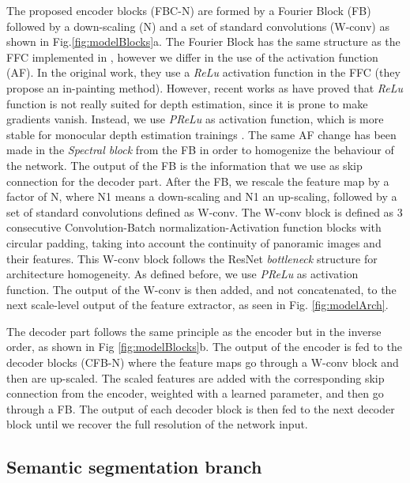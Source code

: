\documentclass[letterpaper, 10 pt, conference]{ieeeconf}
\begin{document}
The proposed encoder blocks (FBC-N) are formed by a Fourier Block (FB) followed by a down-scaling (N) and a set of standard convolutions (W-conv) as shown in Fig.\ref{fig:modelBlocks}a. The Fourier Block has the same structure as the FFC implemented in \cite{suvorov2022resolution}, however we differ in the use of the activation function (AF). In the original work, they use a \textit{ReLu} activation function in the FFC (they propose an in-painting method). 
However, recent works as \cite{pintore2021slicenet} have proved that \textit{ReLu} function is not really suited for depth estimation, since it is prone to make gradients vanish. Instead, we use \textit{PReLu} as activation function, which is more stable for monocular depth estimation trainings \cite{pintore2021slicenet}. The same AF change has been made in the \textit{Spectral block}\cite{chi2020fast} from the FB in order to homogenize the behaviour of the network. The output of the FB is the information that we use as skip connection for the decoder part.
After the FB, we rescale the feature map by a factor of N, where N1 means a down-scaling and N1 an up-scaling, followed by a set of standard convolutions defined as W-conv. The W-conv block is defined as 3 consecutive Convolution-Batch normalization-Activation function blocks with circular padding, taking into account the continuity of panoramic images and their features. 
This W-conv block follows the ResNet\cite{he2016deep} \textit{bottleneck} structure for architecture homogeneity. As defined before, we use \textit{PReLu} as activation function. The output of the W-conv is then added, and not concatenated, to the next scale-level output of the feature extractor, as seen in Fig. \ref{fig:modelArch}.

The decoder part follows the same principle as the encoder but in the inverse order, as shown in Fig \ref{fig:modelBlocks}b. The output of the encoder is fed to the decoder blocks (CFB-N) where the feature maps go through a W-conv block and then are up-scaled. The scaled features are added with the corresponding skip connection from the encoder, weighted with a learned parameter, and then go through a FB. The output of each decoder block is then fed to the next decoder block until we recover the full resolution of the network input.

\subsection{Semantic segmentation branch}
\end{document}
